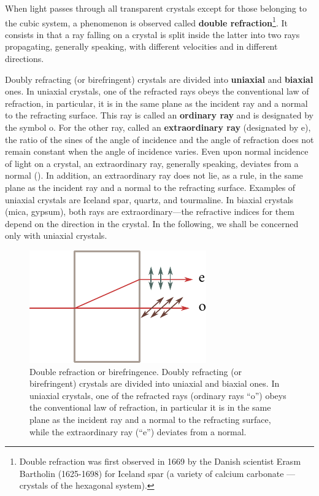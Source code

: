 When light passes through all transparent crystals except for those belonging to the cubic system, a phenomenon is observed called \textbf{double refraction}\footnote{Double refraction was first observed in 1669 by the Danish scientist Erasm Bartholin (1625-1698) for Iceland spar (a variety of calcium carbonate ---crystals of the hexagonal system).}.
It consists in that a ray falling on a crystal is split inside the latter into two rays propagating, generally speaking, with different velocities and in different directions.

Doubly refracting (or birefringent) crystals are divided into \textbf{uniaxial} and \textbf{biaxial} ones.
In uniaxial crystals, one of the refracted rays obeys the conventional law of refraction, in particular, it is in the same plane as the incident ray and a normal to the refracting surface.
This ray is called an \textbf{ordinary ray} and is designated by the symbol o.
For the other ray, called an \textbf{extraordinary ray} (designated by e), the ratio of the sines of the angle of incidence and the angle of refraction does not remain constant when the angle of incidence varies.
Even upon normal incidence of light  on a crystal, an extraordinary ray, generally speaking, deviates from a normal ().
In addition, an extraordinary ray does not lie, as a rule, in the same plane as the incident ray and a normal to the refracting surface.
Examples of uniaxial crystals are Iceland spar, quartz, and tourmaline.
In biaxial crystals (mica, gypsum), both rays are extraordinary---the refractive indices for them depend on the direction in the crystal.
In the following, we shall be concerned only with uniaxial crystals.

\begin{figure}[t]
	\begin{center}
		\includegraphics[scale=1]{figures/ch_19/fig_19_8.pdf}
        \caption[]{Double refraction or birefringence. Doubly refracting (or birefringent) crystals are divided into uniaxial and biaxial ones. In uniaxial crystals, one of the refracted rays (ordinary rays ``o'') obeys the conventional law of refraction, in particular it is in the same plane as the incident ray and a normal to the refracting surface, while the extraordinary ray (``e'') deviates from a normal.}
		\label{fig:19_8}
	\end{center}
	\vspace{-0.8cm}
\end{figure}

